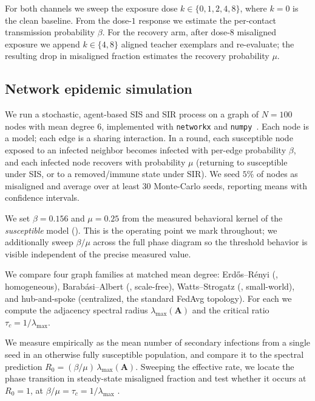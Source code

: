  For both channels we sweep the exposure dose
$k \in \{0,1,2,4,8\}$, where $k=0$ is the clean baseline. From the dose-$1$
response we estimate the per-contact transmission probability $\beta$. For the
recovery arm, after dose-$8$ misaligned exposure we append $k\in\{4,8\}$ aligned
teacher exemplars and re-evaluate; the resulting drop in misaligned fraction
estimates the recovery probability $\mu$.

\subsection{Network epidemic simulation}
\label{sec:method-sim}

 We run a stochastic, agent-based SIS and SIR process on a graph of
$N=100$ nodes with mean degree $6$, implemented with \texttt{networkx} and
\texttt{numpy}~\citep{hagberg2008networkx}. Each node is a model; each edge is a
sharing interaction. In a round, each susceptible node exposed to an infected
neighbor becomes infected with per-edge probability $\beta$, and each infected
node recovers with probability $\mu$ (returning to susceptible under SIS, or to a
removed/immune state under SIR). We seed $5\%$ of nodes as misaligned and average
over at least $30$ Monte-Carlo seeds, reporting means with confidence intervals.

 We set $\beta = 0.156$ and $\mu = 0.25$ from the measured
behavioral kernel of the \emph{susceptible} model ().
This is the operating point we mark throughout; we additionally sweep $\beta/\mu$
across the full phase diagram so the threshold behavior is visible independent of
the precise measured value.

 We compare four graph families at matched mean degree:
Erd\H{o}s--R\'enyi (\er, homogeneous), Barab\'asi--Albert (\ba, scale-free),
Watts--Strogatz (\ws, small-world), and hub-and-spoke (centralized, the standard
FedAvg topology). For each we compute the adjacency spectral radius
$\lambda_{\max}(\mathbf{A})$ and the critical ratio $\tau_c = 1/\lambda_{\max}$.

 We measure \Rzero empirically as the
mean number of secondary infections from a single seed in an otherwise fully
susceptible population, and compare it to the spectral prediction
$R_0 = (\beta/\mu)\,\lambda_{\max}(\mathbf{A})$. Sweeping the effective rate, we
locate the phase transition in steady-state misaligned fraction and test whether
it occurs at $R_0=1$, \ie at $\beta/\mu = \tau_c = 1/\lambda_{\max}$
\citep{pastorsatorras2015epidemic,castellano2010thresholds}.


